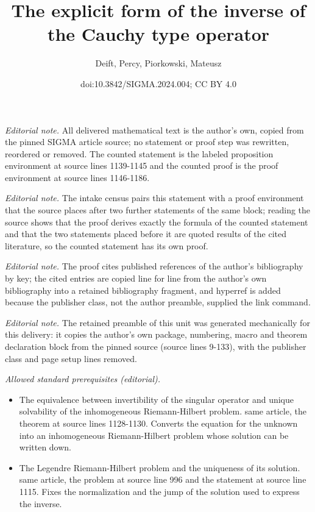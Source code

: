 \documentclass[10pt,a4paper]{amsart}
\title{The explicit form of the inverse of the Cauchy type operator}
\author{Deift, Percy, Piorkowski, Mateusz}
\date{doi:10.3842/SIGMA.2024.004; CC BY 4.0}
\numberwithin{equation}{section}
\begin{document}
\maketitle
\setcounter{section}{4}
\setcounter{Theorem}{5}
\noindent\textit{Editorial note.} All delivered mathematical text is the author's own, copied from the pinned SIGMA article source; no statement or proof step was rewritten, reordered or removed. The counted statement is the labeled proposition environment at source lines 1139-1145 and the counted proof is the proof environment at source lines 1146-1186.\par\medskip
\noindent\textit{Editorial note.} The intake census pairs this statement with a proof environment that the source places after two further statements of the same block; reading the source shows that the proof derives exactly the formula of the counted statement and that the two statements placed before it are quoted results of the cited literature, so the counted statement has its own proof.\par\medskip
\noindent\textit{Editorial note.} The proof cites published references of the author's bibliography by key; the cited entries are copied line for line from the author's own bibliography into a retained bibliography fragment, and hyperref is added because the publisher class, not the author preamble, supplied the link command.\par\medskip
\noindent\textit{Editorial note.} The retained preamble of this unit was generated mechanically for this delivery: it copies the author's own package, numbering, macro and theorem declaration block from the pinned source (source lines 9-133), with the publisher class and page setup lines removed.\par\medskip
\noindent\textit{Allowed standard prerequisites (editorial).}\begin{itemize}
\item The equivalence between invertibility of the singular operator and unique solvability of the inhomogeneous Riemann-Hilbert problem. same article, the theorem at source lines 1128-1130. Converts the equation for the unknown into an inhomogeneous Riemann-Hilbert problem whose solution can be written down.
\item The Legendre Riemann-Hilbert problem and the uniqueness of its solution. same article, the problem at source line 996 and the statement at source line 1115. Fixes the normalization and the jump of the solution used to express the inverse.
\end{itemize}\medskip
\end{document}
